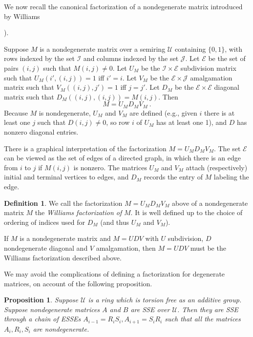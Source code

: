\documentclass{amsart}
\newtheorem{proposition}[theorem]{Proposition}
\theoremstyle{definition}
\newtheorem{definition}[theorem]{Definition}
\theoremstyle{remark}
\newcommand{\ri}{\mathcal U}
\numberwithin{equation}{section}
\begin{document}
We now recall the canonical factorization of a nondegenerate matrix 
introduced by Williams {\cite{Wi}). 


Suppose $M$ is a nondegenerate matrix over a semiring $\mathcal U$ 
containing $\{0,1\}$, 
with rows indexed by the set $\mathcal I$ and columns indexed by the 
set $\mathcal J$. 
Let $\mathcal E$ be the set of pairs $(i,j)$ such that $M(i,j)\neq 0$.  
Let $U_M$ be the $\mathcal I \times \mathcal E$
subdivision matrix such that $U_M(i',(i,j))=1$ iff $i'=i$. 
Let $V_M$ be the $\mathcal E \times \mathcal J$ amalgamation matrix such that 
$V_M((i,j),j')=1$ iff $j=j'$. Let $D_M$ be the $\mathcal E \times \mathcal E$ 
diagonal matrix such that $D_M((i,j),(i,j))= M(i,j)$. 
Then 
\[
M = U_MD_MV_M \ .
\] 
Because $M$ is nondegenerate, $U_M$ and $V_M$ are defined (e.g., given $i$
there is at least one $j$ such that $D(i,j)\neq 0$, so row $i$ of $U_M$ has 
at least one 1), and $D$ has nonzero diagonal entries.   

There is a graphical interpretation of the factorization 
$M = U_MD_MV_M $. The set $\mathcal E$ can be viewed as the set of 
edges of a directed graph, in which there is an edge from $i$ to $j$
if $M(i,j)$ is nonzero. The matrices $U_M$ and $V_M$ attach (respectively)
initial and terminal vertices to edges, and $D_M$ records the entry of 
$M$ labeling the edge. 

\begin{definition}
We call the factorization $M = U_MD_MV_M$ above 
of a nondegenerate matrix $M$  
the {\it Williams factorization of } $M$. It is well defined up to 
the choice of ordering of indices used for $D_M$ (and thus $U_M$ and 
$V_M$). 
\end{definition} 
If $M$ is a nondegenerate matrix and $M=UDV$ with 
$U$ subdivision, $D$ nondegenerate diagonal and $V$ amalgamation, 
then $M=UDV$ must be the Williams factorization described above. 

We may avoid the complications of defining a  factorization 
for degenerate matrices, on account of the following proposition. 


\begin{proposition} \label{nondegeneratesseprop} 
Suppose $\ri$ is a ring which is torsion free as an additive group. 
Suppose nondegenerate matrices $A$ and $B$ are SSE over $\ri$. 
Then they are SSE through a chain of ESSEs 
$A_{i-1} =R_iS_i, A_{i+1}=S_iR_i$ such that all the matrices 
$A_i, R_i,S_i $ are nondegenerate. 
\end{proposition} 

}
\end{document}
